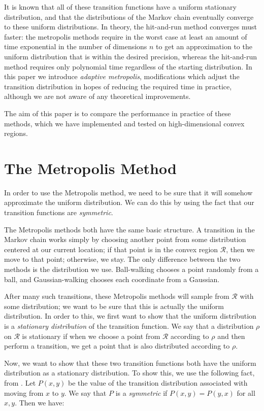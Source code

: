 \documentclass[11pt]{article}
\begin{document}
It is known that all of these transition functions have a uniform stationary distribution, and that the distributions of the Markov chain eventually converge to these uniform distributions. In theory, the hit-and-run method converges must faster: the metropolis methods require in the worst case at least an amount of time exponential in the number of dimensions $n$ to get an approximation to the uniform distribution that is within the desired precision, whereas the hit-and-run method requires only polynomial time regardless of the starting distribution. In this paper we introduce \emph{adaptive metropolis}, modifications which adjust the transition distribution in hopes of reducing the required time in practice, although we are not aware of any theoretical improvements.

The aim of this paper is to compare the performance in practice of these methods, which we have implemented and tested on high-dimensional convex regions.

\section{The Metropolis Method}

In order to use the Metropolis method, we need to be sure that it will somehow approximate the uniform distribution. We can do this by using the fact that our transition functions are \emph{symmetric}.

The Metropolis methods both have the same basic structure. A transition in the Markov chain works simply by choosing another point from some distribution centered at our current location; if that point is in the convex region $\mathcal{R}$, then we move to that point; otherwise, we stay. The only difference between the two methods is the distribution we use. Ball-walking chooses a point randomly from a ball, and Gaussian-walking chooses each coordinate from a Gaussian.

After many such transitions, these Metropolis methods will sample from $\mathcal{R}$ with some distribution; we want to be sure that this is actually the uniform distribution. In order to this, we first want to show that the uniform distribution is a \emph{stationary distribution} of the transition function. We say that a distribution $\rho$ on $\mathcal{R}$ is stationary if when we choose a point from $\mathcal{R}$ according to $\rho$ and then perform a transition, we get a point that is also distributed according to $\rho$.

Now, we want to show that these two transition functions both have the uniform distribution as a stationary distribution. To show this, we use the following fact, from \cite{Smith}. Let $P(x,y)$ be the value of the transition distribution associated with moving from $x$ to $y$. We say that $P$ is a \emph{symmetric} if $P(x,y) = P(y,x)$ for all $x,y$. Then we have:
\end{document}

